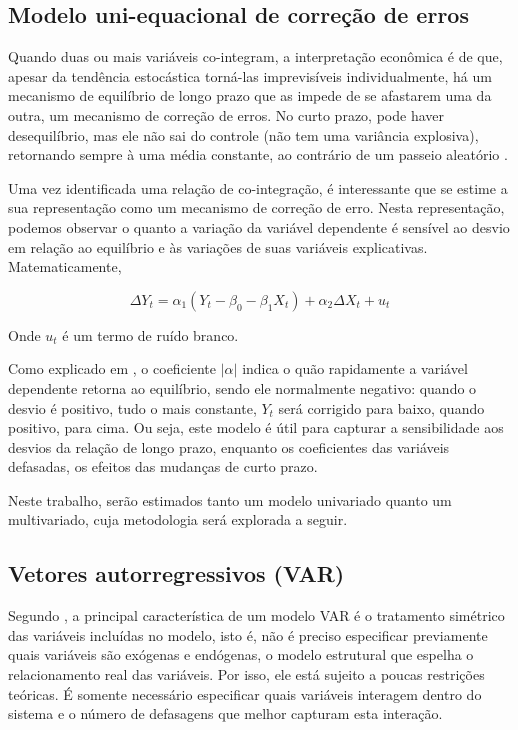 \documentclass[a4paper,
               article,
               12pt,
               openany,
               oneside,
               english,
               brazil]{abntex2}
\numberwithin{equation}{section}
\begin{document}
    \subsection{Modelo uni-equacional de correção de erros}

    Quando duas ou mais variáveis co-integram, a interpretação econômica é de que, apesar da tendência estocástica torná-las imprevisíveis individualmente, há um mecanismo de equilíbrio de longo prazo que as impede de se afastarem uma da outra, um mecanismo de correção de erros. No curto prazo, pode haver desequilíbrio, mas ele não sai do controle (não tem uma variância explosiva), retornando sempre à uma média constante, ao contrário de um passeio aleatório \textcite[757-758]{gujarati}.

    Uma vez identificada uma relação de co-integração, é interessante que se estime a sua representação como um mecanismo de correção de erro. Nesta representação, podemos observar o quanto a variação da variável dependente é sensível ao desvio em relação ao equilíbrio e às variações de suas variáveis explicativas. Matematicamente, 

    \begin{equation}
        \Delta Y_t = \alpha_1 (Y_t - \beta_0 - \beta_1 X_t) + \alpha_2 \Delta X_t + u_t \label{ecm}
    \end{equation}

    Onde $ u_t $ é um termo de ruído branco. 
    
    Como explicado em \textcite{coint1}, o coeficiente $ \lvert \alpha \rvert $ indica o quão rapidamente a variável dependente retorna ao equilíbrio, sendo ele normalmente negativo: quando o desvio é positivo, tudo o mais constante, $ Y_t $ será corrigido para baixo, quando positivo, para cima. Ou seja, este modelo é útil para capturar a sensibilidade aos desvios da relação de longo prazo, enquanto os coeficientes das variáveis defasadas, os efeitos das mudanças de curto prazo.
    
    Neste trabalho, serão estimados tanto um modelo univariado quanto um multivariado, cuja metodologia será explorada a seguir.

    \subsection{Vetores autorregressivos (VAR)}

    Segundo \textcite[51-52]{gustavo}, a principal característica de um modelo VAR é o tratamento simétrico das variáveis incluídas no modelo, isto é, não é preciso especificar previamente quais variáveis são exógenas e endógenas, o modelo estrutural que espelha o relacionamento real das variáveis. Por isso, ele está sujeito a poucas restrições teóricas. É somente necessário especificar quais variáveis interagem dentro do sistema e o número de defasagens que melhor capturam esta interação.
    
\end{document}
